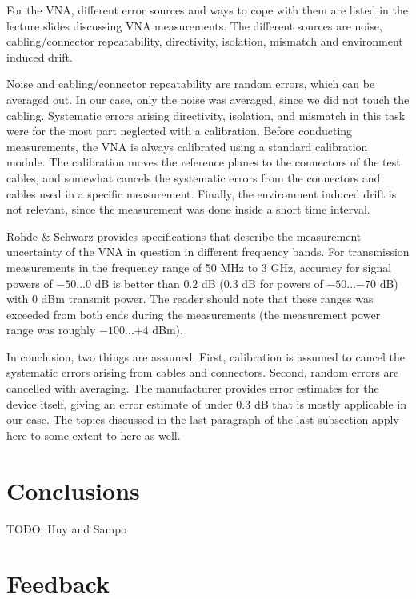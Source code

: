 \documentclass[a4paper, 12pt]{article}
\begin{document}
For the VNA, different error sources and ways to cope with them are listed in the 
lecture slides discussing VNA measurements. The different sources are noise, 
cabling/connector repeatability, directivity, isolation, mismatch and environment 
induced drift. 

Noise and cabling/connector repeatability are random errors, which can be averaged 
out. In our case, only the noise was averaged, since we did not touch the cabling. 
Systematic errors arising directivity, isolation, and mismatch in this task were
for the most part neglected with a calibration. Before conducting measurements, 
the VNA is always calibrated using a standard calibration module. The calibration 
moves the reference planes to the connectors of the test cables, and somewhat 
cancels the systematic errors from the connectors and cables used in a specific 
measurement. Finally, the environment induced drift is not relevant, since the 
measurement was done inside a short time interval.

Rohde \& Schwarz provides specifications that describe the measurement uncertainty 
of the VNA in question in different frequency bands. For transmission measurements 
in the frequency range of 50 MHz to 3 GHz, accuracy for signal powers of $-50 \ldots 0$ 
dB is better than $0.2$ dB ($0.3$ dB for powers of $-50 \ldots {-70}$ dB) with 0 dBm 
transmit power. \cite{vna} The reader should note that these ranges was exceeded 
from both ends during the measurements (the measurement power range was roughly 
$-100 \ldots {+4}$ dBm). 

In conclusion, two things are assumed. First, calibration is assumed to cancel the 
systematic errors arising from cables and connectors. Second, random errors are 
cancelled with averaging. The manufacturer provides error estimates for the device 
itself, giving an error estimate of under $0.3$ dB that is mostly applicable in 
our case. The topics discussed in the last paragraph of the last subsection apply 
here to some extent to here as well.


\newpage
\section{Conclusions}

TODO: Huy and Sampo


\newpage
\section{Feedback}
\end{document}
